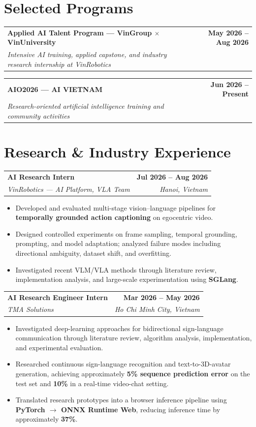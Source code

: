 \documentclass[a4paper,10pt]{article}
\makeatletter
\newcommand{\cvitem}{\itemsep0.85mm\parskip0pt\parsep0pt}
\newcommand{\bulletliststart}{\begin{itemize}[leftmargin=4.2mm,label=\raisebox{0.2ex}{\tiny$\bullet$},topsep=1.3mm] \cvitem}
\newcommand{\bulletlistend}{\end{itemize}\vspace{0.6mm}}
\newcommand{\entry}[4]{%
  \par\noindent
  \begin{tabularx}{\textwidth}{@{}Xr@{}}
    \textbf{#1} & \textbf{#2} \\
    \textit{#3} & \textit{#4}
  \end{tabularx}
  \par\vspace{0.5mm}
}
\newcommand{\experience}[4]{%
  \par\noindent
  \begin{tabularx}{\textwidth}{@{}Xr@{}}
    \textbf{#1} & \textbf{#2} \\
    \textit{#3} & \textit{#4}
  \end{tabularx}
  \par\vspace{0.5mm}
}
\makeatother
\begin{document}
\vspace{-2mm}
\section{Selected Programs}
\entry
  {Applied AI Talent Program --- VinGroup $\times$ VinUniversity}
  {May 2026 -- Aug 2026}
  {Intensive AI training, applied capstone, and industry research internship at VinRobotics}
  {}
\vspace{2mm}

\entry
  {AIO2026 --- AI VIETNAM}
  {Jun 2026 -- Present}
  {Research-oriented artificial intelligence training and community activities}
  {}

\section{Research \& Industry Experience}
\experience
  {AI Research Intern}
  {Jul 2026 -- Aug 2026}
  {VinRobotics --- AI Platform, VLA Team}
  {Hanoi, Vietnam}
\bulletliststart
  \item Developed and evaluated multi-stage vision--language pipelines for \textbf{temporally grounded action captioning} on egocentric video.
  \item Designed controlled experiments on frame sampling, temporal grounding, prompting, and model adaptation; analyzed failure modes including directional ambiguity, dataset shift, and overfitting.
  \item Investigated recent VLM/VLA methods through literature review, implementation analysis, and large-scale experimentation using \textbf{SGLang}.
\bulletlistend
\vspace{1.3mm}

\experience
  {AI Research Engineer Intern}
  {Mar 2026 -- May 2026}
  {TMA Solutions}
  {Ho Chi Minh City, Vietnam}
\bulletliststart
  \item Investigated deep-learning approaches for bidirectional sign-language communication through literature review, algorithm analysis, implementation, and experimental evaluation.
  \item Researched continuous sign-language recognition and text-to-3D-avatar generation, achieving approximately \textbf{5\% sequence prediction error} on the test set and \textbf{10\%} in a real-time video-chat setting.
  \item Translated research prototypes into a browser inference pipeline using \textbf{PyTorch $\rightarrow$ ONNX Runtime Web}, reducing inference time by approximately \textbf{37\%}.
\bulletlistend
\vspace{1.3mm}
\end{document}
